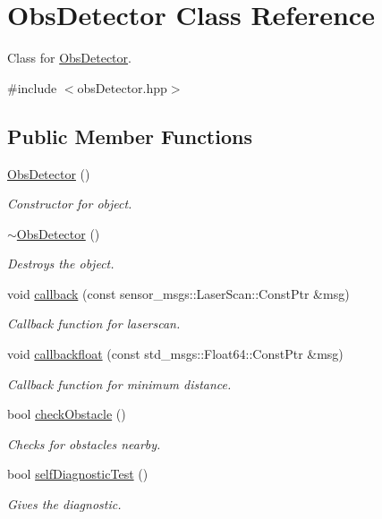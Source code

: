 \hypertarget{class_obs_detector}{}\section{Obs\+Detector Class Reference}
\label{class_obs_detector}


Class for \hyperlink{class_obs_detector}{Obs\+Detector}.  




{\ttfamily \#include $<$obs\+Detector.\+hpp$>$}

\subsection*{Public Member Functions}
\begin{DoxyCompactItemize}
\item 
\hyperlink{class_obs_detector_a8c558094b5f5cf6301131012b4bb967d}{Obs\+Detector} ()
\begin{DoxyCompactList}\small\item\em Constructor for object. \end{DoxyCompactList}\item 
\hyperlink{class_obs_detector_a15bf3a79d3f9d48777fc02ab1c5a2ef2}{$\sim$\+Obs\+Detector} ()\hypertarget{class_obs_detector_a15bf3a79d3f9d48777fc02ab1c5a2ef2}{}\label{class_obs_detector_a15bf3a79d3f9d48777fc02ab1c5a2ef2}

\begin{DoxyCompactList}\small\item\em Destroys the object. \end{DoxyCompactList}\item 
void \hyperlink{class_obs_detector_a9a1e78609077454c2a7f6b2140b21dbd}{callback} (const sensor\+\_\+msgs\+::\+Laser\+Scan\+::\+Const\+Ptr \&msg)
\begin{DoxyCompactList}\small\item\em Callback function for laserscan. \end{DoxyCompactList}\item 
void \hyperlink{class_obs_detector_a184c914ee70ead017627268fe4260576}{callbackfloat} (const std\+\_\+msgs\+::\+Float64\+::\+Const\+Ptr \&msg)
\begin{DoxyCompactList}\small\item\em Callback function for minimum distance. \end{DoxyCompactList}\item 
bool \hyperlink{class_obs_detector_a43ec2e5144aae0649449ed5dea446229}{check\+Obstacle} ()
\begin{DoxyCompactList}\small\item\em Checks for obstacles nearby. \end{DoxyCompactList}\item 
bool \hyperlink{class_obs_detector_ae2ba5b25de3610f0d233f830400f7c1c}{self\+Diagnostic\+Test} ()
\begin{DoxyCompactList}\small\item\em Gives the diagnostic. \end{DoxyCompactList}\end{DoxyCompactItemize}


